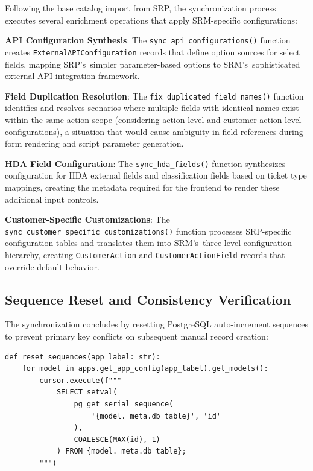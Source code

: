Following the base catalog import from SRP, the synchronization process executes several enrichment operations that apply SRM-specific configurations:

\textbf{API Configuration Synthesis}: The \texttt{sync\_api\_configurations()} function creates \texttt{ExternalAPIConfiguration} records that define option sources for select fields, mapping SRP's~simpler parameter-based options to SRM's~sophisticated external API integration framework.

\textbf{Field Duplication Resolution}: The \texttt{fix\_duplicated\_field\_names()} function identifies and resolves scenarios where multiple fields with identical names exist within the same action scope (considering action-level and customer-action-level configurations), a situation that would cause ambiguity in field references during form rendering and script parameter generation.

\textbf{HDA Field Configuration}: The \texttt{sync\_hda\_fields()} function synthesizes configuration for HDA external fields and classification fields based on ticket type mappings, creating the metadata required for the frontend to render these additional input controls.

\textbf{Customer-Specific Customizations}: The \texttt{sync\_customer\_specific\_customizations()} function processes SRP-specific configuration tables and translates them into SRM's~three-level configuration hierarchy, creating \texttt{CustomerAction} and \texttt{CustomerActionField} records that override default behavior.

\subsection{Sequence Reset and Consistency Verification}

The synchronization concludes by resetting PostgreSQL auto-increment sequences to prevent primary key conflicts on subsequent manual record creation:

\begin{verbatim}
def reset_sequences(app_label: str):
    for model in apps.get_app_config(app_label).get_models():
        cursor.execute(f"""
            SELECT setval(
                pg_get_serial_sequence(
                    '{model._meta.db_table}', 'id'
                ),
                COALESCE(MAX(id), 1)
            ) FROM {model._meta.db_table};
        """)
\end{verbatim}

